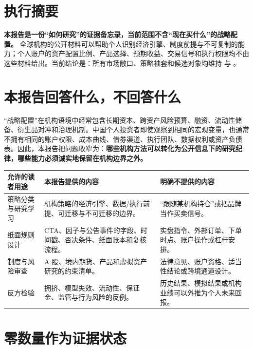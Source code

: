 \section{执行摘要}

\begin{keyinsight}[结论先行]
\textbf{本报告是一份“如何研究”的证据备忘录，当前范围不含“现在买什么”的战略配置。} 全球机构的公开材料可以帮助个人识别经济引擎、制度前提与不可复制的能力；个人账户的资产配置比例、产品选择、预期收益、交易信号和执行权限均不由这些材料给出。当前结论是：所有市场敞口、策略袖套和候选对象均维持 \qzero{} 与 \noaction{}。
\end{keyinsight}

\section{本报告回答什么，不回答什么}

“战略配置”在机构语境中经常包含长期资本、跨资产风险预算、融资、流动性储备、衍生品对冲和治理机制。中国个人投资者即使观察到相同的宏观变量，也通常不拥有相同的账户权限、成本曲线、借券渠道、执行团队、数据权利或资产负债表。因此，本报告把问题收窄为：\textbf{哪些机构方法可以转化为公开信息下的研究纪律，哪些能力必须诚实地保留在机构边界之外。}

\begin{exhibitbox}
\small
\begin{tabularx}{\exhibitboxwidth}{L{3.2cm}X L{4.0cm}}
\toprule
\textbf{允许的读者用途} & \textbf{本报告提供的内容} & \textbf{明确不提供的内容} \\
\midrule
策略分类与研究学习 & 机构策略的经济引擎、数据/执行前提、可迁移与不可迁移的边界。 & “跟随某机构持仓”或把品牌当作买卖信号。 \\
纸面规则设计 & CTA、因子与公告事件的字段、时间戳、否决条件、纸面账本和复核流程。 & 实盘指令、外部订单、下单时点、账户操作或杠杆安排。 \\
制度与风险审查 & A 股、境内期货、产品和虚拟资产研究的约束清单。 & 法律意见、账户资格、适当性结论或跨境通道设计。 \\
反方检验 & 拥挤、模型失效、流动性、保证金、监管与行为风险的反例。 & 历史结果、模拟结果或机构业绩可以外推为个人未来回报。 \\
\bottomrule
\end{tabularx}
\end{exhibitbox}

\section{零数量作为证据状态}

